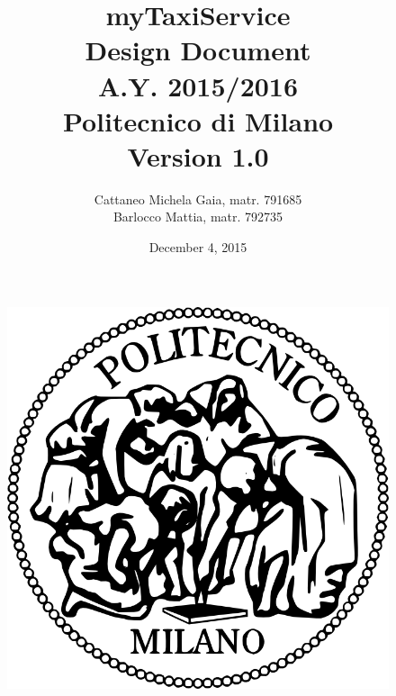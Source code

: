 \documentclass[18pt,oneside,a4paper, titlepage]{article}
\begin{document}
\begin{figure}[t]
	\centering
	\includegraphics[scale=0.35]{logo-polimi.png}
\end{figure}
\title{\textbf{myTaxiService}\\\textbf{D}esign \textbf{D}ocument\\ A.Y. 2015/2016\\
	Politecnico di Milano \\ Version 1.0}	
\author{Cattaneo Michela Gaia, matr. 791685\\Barlocco Mattia, matr. 792735 }
\date{December 4, 2015}
\maketitle

\newpage
	\tableofcontents

\newpage
	
		
	
\newpage	
\end{document}
